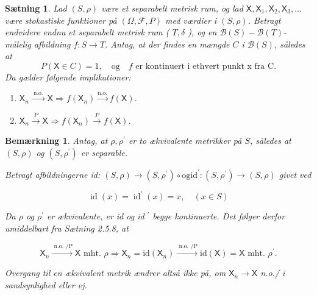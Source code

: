 \documentclass{article}
\newcommand{\1}{\mathbbm{1}}
\newcommand{\X}{\mathsf{X}}
\theoremstyle{boxed}
\newtheorem{remark}[theorem]{Bemærkning}
\newtheorem{proposition}[theorem]{Sætning}
\begin{document}
\begin{theorem-box}
    \begin{proposition}
        Lad $(S, \rho)$ være et separabelt metrisk rum, og lad $\X, \X_1, \X_2, \X_3, \ldots$ være stokastiske funktioner på $(\Omega, \mathcal{F}, P)$ med værdier i $(S, \rho)$.
Betragt endvidere endnu et separabelt metrisk rum ( $T, \delta$ ), og en $\mathcal{B}(S)-\mathcal{B}(T)$-målelig afbildning $f: S \rightarrow T$.
Antag, at der findes en mængde $C$ i $\mathcal{B}(S)$, således at $$P(\X \in C)=1, \quad \text{og}\quad f \text{ er kontinuert i ethvert punkt x fra C}.$$
Da gælder følgende implikationer:
\begin{enumerate}
    \item[\textnormal{(i)}]$\X_n \xrightarrow{\text { n.o. }} \X \Longrightarrow f\left(\X_n\right) \xrightarrow{\text{n.o.}} f(\X)$.
    \item[\textnormal{(ii)}]$\X_n \xrightarrow{P} \X \Longrightarrow f\left(\X_n\right) \xrightarrow{P} f(\X)$.
\end{enumerate}
    \end{proposition}
\end{theorem-box}
\begin{remark}
    Antag, at $\rho, \rho^{\prime}$ er to ækvivalente metrikker på $S$, således at $(S, \rho)$ og $\left(S, \rho^{\prime}\right)$ er separable.

Betragt afbildningerne id: $(S, \rho) \rightarrow\left(S, \rho^{\prime}\right) \circ \mathrm{og} \mathrm{id}^{\prime}:\left(S, \rho^{\prime}\right) \rightarrow(S, \rho)$ givet ved

$$
\operatorname{id}(x)=\operatorname{id}^{\prime}(x)=x, \quad(x \in S)
$$


Da $\rho$ og $\rho^{\prime}$ er ækvivalente, er id og id ${ }^{\prime}$ begge kontinuerte.
Det følger derfor umiddelbart fra Sætning 2.5.8, at

$$
\X_n \xrightarrow{\text { n.o. } / \mathrm{P}} \X \text { mht. } \rho \Longrightarrow \X_n=\mathrm{id}\left(\X_n\right) \xrightarrow{\text { n.o. } / \mathrm{P}} \mathrm{id}(\X)=\X \text { mht. } \rho^{\prime} .
$$


Overgang til en ækvivalent metrik ændrer altså ikke på, om $\X_n \rightarrow \X$ n.o./ i sandsynlighed eller ej.
\end{remark}
\end{document}
